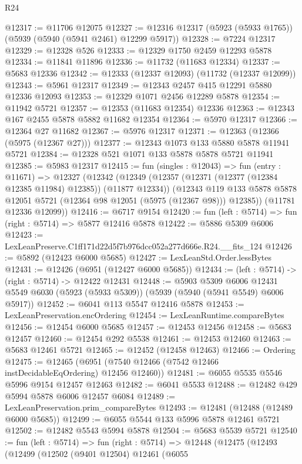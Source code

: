 \begin{lexlean}{R24}
\begin{coremodule}
@12317 := @11706 @12075
@12327 := @12316 @12317 (@5923 (@5933 @1765)) (@5939 (@5940 (@5941 @2461) @12299 @5917))
@12328 := @7224 @12317
@12329 := @12328 @526
@12333 := @12329 @1750 @2459 @12293 @5878
@12334 := @11841 @11896
@12336 := @11732 (@11683 @12334)
@12337 := @5683 @12336
@12342 := @12333 (@12337 @12093) (@11732 (@12337 @12099))
@12343 := @5961 @12317
@12349 := @12343 @2457 @415 @12291 @5880 @12336 @12093
@12353 := @12329 @1071 @2456 @12289 @5878
@12354 := @11942 @5721
@12357 := @12353 (@11683 @12354) @12336
@12363 := @12343 @167 @2455 @5878 @5882 @11682 @12354
@12364 := @5970 @12317
@12366 := @12364 @27 @11682
@12367 := @5976 @12317
@12371 := @12363 (@12366 (@5975 (@12367 @27)))
@12377 := @12343 @1073 @133 @5880 @5878 @11941 @5721
@12384 := @12328 @521 @1071 @133 @5878 @5878 @5721 @11941
@12385 := @5983 @12317
@12415 := fun (singles : @12043) =>
  fun (entry : @11671) =>
  @12327
    (@12342
      (@12349
        (@12357 (@12371 (@12377 (@12384 @12385 @11984) @12385)) (@11877 @12334))
        (@12343 @119 @133 @5878 @5878 @12051 @5721 (@12364 @98 @12051 (@5975 (@12367 @98))) @12385))
      (@11781 @12336 @12099))
@12416 := @6717 @9154
@12420 := fun (left : @5714) => fun (right : @5714) => @5877 @12416 @5878
@12422 := @5886 @5309 @6006
@12423 := LexLeanPreserve.C1ff171d22d5f7b976dcc052a277d666e.R24.__fits_124
@12426 := @5892 (@12423 @6000 @5685)
@12427 := LexLeanStd.Order.lessBytes
@12431 := @12426 (@6951 (@12427 @6000 @5685))
@12434 := (left : @5714) -> (right : @5714) -> @12422 @12431
@12448 := @5903
    @5309
    @6006
    @12431
    @5549
    @6030
    (@5923 (@5933 @5309))
    (@5939 (@5940 (@5941 @5549) @6006 @5917))
@12452 := @6041 @113 @5547 @12416 @5878
@12453 := LexLeanPreservation.encOrdering
@12454 := LexLeanRuntime.compareBytes
@12456 := @12454 @6000 @5685
@12457 := @12453 @12456
@12458 := @5683 @12457
@12460 := @12454 @292 @5538
@12461 := @12453 @12460
@12463 := @5683 @12461 @5721
@12465 := @12452 (@12458 @12463)
@12466 := Ordering
@12475 := @12465 (@6951 (@7540 @12466 (@7542 @12466 instDecidableEqOrdering) @12456 @12460))
@12481 := @6055 @5535 @5546 @5996 @9154 @12457 @12463
@12482 := @6041 @5533
@12488 := @12482 @429 @5994 @5878 @6006 @12457 @6084
@12489 := LexLeanPreservation.prim_compareBytes
@12493 := @12481 (@12488 (@12489 @6000 @5685))
@12499 := @6055 @5544 @133 @5996 @5878 @12461 @5721
@12502 := @12482 @5543 @5994 @5878
@12504 := @5683 @5539 @5721
@12540 := fun (left : @5714) =>
  fun (right : @5714) =>
  @12448
    (@12475
      (@12493
        (@12499
          (@12502
            (@9401 @12504)
            @12461
            (@6055

\end{coremodule}
\end{lexlean}
